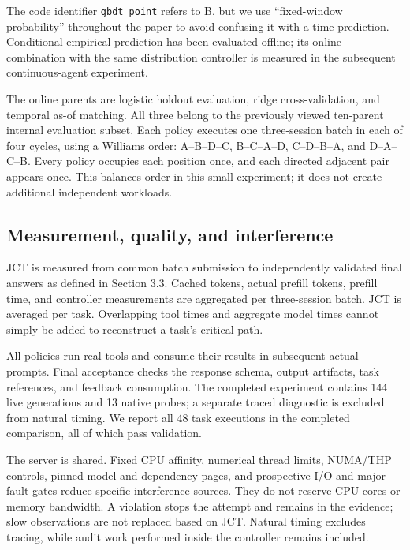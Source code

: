 \documentclass[sigconf, screen, review]{acmart}
\begin{document}
The code identifier \nolinkurl{gbdt_point} refers to B, but we use
``fixed-window probability'' throughout the paper to avoid confusing it
with a time prediction. Conditional empirical prediction has been
evaluated offline; its online combination with the same distribution
controller is measured in the subsequent continuous-agent experiment.

The online parents are logistic holdout evaluation, ridge
cross-validation, and temporal as-of matching. All three belong to the
previously viewed ten-parent internal evaluation subset. Each policy
executes one three-session batch in each of four cycles, using a
Williams order: A--B--D--C, B--C--A--D, C--D--B--A, and D--A--C--B.
Every policy occupies each position once, and each directed adjacent
pair appears once. This balances order in this small experiment; it does
not create additional independent workloads.

\subsection{Measurement, quality, and
interference}\label{measurement-quality-and-interference}

JCT is measured from common batch submission to independently validated
final answers as defined in Section 3.3. Cached tokens, actual prefill
tokens, prefill time, and controller measurements are aggregated per
three-session batch. JCT is averaged per task. Overlapping tool times
and aggregate model times cannot simply be added to reconstruct a task's
critical path.

All policies run real tools and consume their results in subsequent
actual prompts. Final acceptance checks the response schema, output
artifacts, task references, and feedback consumption. The completed
experiment contains 144 live generations and 13 native probes; a
separate traced diagnostic is excluded from natural timing. We report
all 48 task executions in the completed comparison, all of which pass
validation.

The server is shared. Fixed CPU affinity, numerical thread limits,
NUMA/THP controls, pinned model and dependency pages, and prospective
I/O and major-fault gates reduce specific interference sources. They do
not reserve CPU cores or memory bandwidth. A violation stops the attempt
and remains in the evidence; slow observations are not replaced based on
JCT. Natural timing excludes tracing, while audit work performed inside
the controller remains included.
\end{document}
